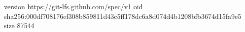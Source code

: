 version https://git-lfs.github.com/spec/v1
oid sha256:000df708176ef308b859811d43c5ff178dc6a8d074d4b1208bfb3674d15fa9e5
size 87544
